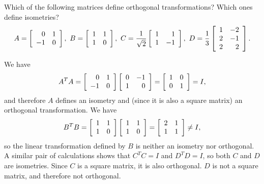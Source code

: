 \documentclass{ximera}
\begin{document}
\begin{example}\label{ex:orthogonal-transformations}
  Which of the following matrices define orthogonal transformations?
  Which ones define isometries?
  \begin{equation*}
    A = \startmat{rr}
      0  & 1 \\
      -1 & 0 \\
    \stopmat,\quad
    B = \startmat{rr}
      1 & 1 \\
      1 & 0 \\
    \stopmat,\quad
    C = \frac{1}{\sqrt{2}}\startmat{rr}
      1 & 1 \\
      1 & -1 \\
    \stopmat,\quad
    D = \frac{1}{3}\startmat{rr}
      1 & -2 \\
      2 & -1 \\
      2 &  2 \\
    \stopmat.
  \end{equation*}
\end{example}

\begin{solution}
  We have
  \begin{equation*}
    A^TA = \startmat{rr}
      0  & 1 \\
      -1 & 0 \\
    \stopmat\startmat{rr}
      0  & -1 \\
      1 & 0 \\
    \stopmat = \startmat{rr}
      1 & 0 \\
      0 & 1 \\
    \stopmat = I,
  \end{equation*}
  and therefore $A$ defines an isometry and (since it is also a square
  matrix) an orthogonal transformation. We have
  \begin{equation*}
    B^TB = \startmat{rr}
      1 & 1 \\
      1 & 0 \\
    \stopmat\startmat{rr}
      1 & 1 \\
      1 & 0 \\
    \stopmat = \startmat{rr}
      2 & 1 \\
      1 & 1 \\
    \stopmat \neq I,
  \end{equation*}
  so the linear transformation defined by $B$ is neither an isometry
  nor orthogonal. A similar pair of calculations shows that $C^TC=I$
  and $D^TD=I$, so both $C$ and $D$ are isometries. Since $C$ is a
  square matrix, it is also orthogonal. $D$ is not a square matrix,
  and therefore not orthogonal.
\end{solution}
\end{document}
